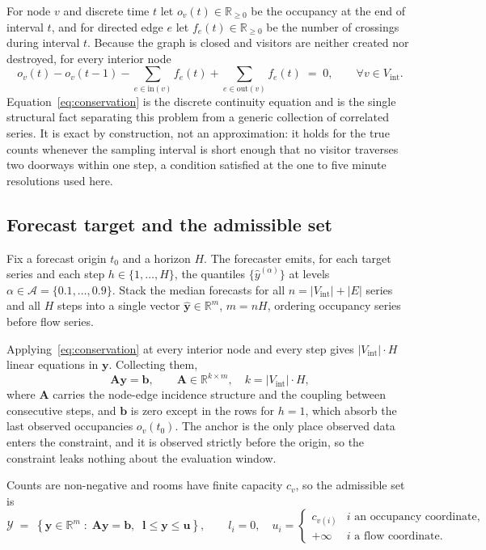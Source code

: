 \documentclass[11pt]{article}
\theoremstyle{plain}
\theoremstyle{definition}
\theoremstyle{remark}
\newcommand{\bA}{\bm{A}}
\newcommand{\by}{\bm{y}}
\newcommand{\bb}{\bm{b}}
\newcommand{\yhat}{\hat{\by}}
\newcommand{\cY}{\mathcal{Y}}
\newcommand{\Rb}{\mathbb{R}}
\begin{document}
For node $v$ and discrete time $t$ let $o_v(t) \in \Rb_{\ge 0}$ be the occupancy at the end of interval $t$, and for directed edge $e$ let $f_e(t) \in \Rb_{\ge 0}$ be the number of crossings during interval $t$. Because the graph is closed and visitors are neither created nor destroyed, for every interior node
\begin{equation}
o_v(t) - o_v(t-1) - \sum_{e \in \mathrm{in}(v)} f_e(t) + \sum_{e \in \mathrm{out}(v)} f_e(t) \;=\; 0,
\qquad \forall v \in V_{\mathrm{int}}.
\label{eq:conservation}
\end{equation}
Equation~\eqref{eq:conservation} is the discrete continuity equation and is the single structural fact separating this problem from a generic collection of correlated series. It is exact by construction, not an approximation: it holds for the true counts whenever the sampling interval is short enough that no visitor traverses two doorways within one step, a condition satisfied at the one to five minute resolutions used here.

\subsection{Forecast target and the admissible set}

Fix a forecast origin $t_0$ and a horizon $H$. The forecaster emits, for each target series and each step $h \in \{1,\dots,H\}$, the quantiles $\{\hat{y}^{(\alpha)}\}$ at levels $\alpha \in \mathcal{A} = \{0.1,\dots,0.9\}$. Stack the median forecasts for all $n = |V_{\mathrm{int}}| + |E|$ series and all $H$ steps into a single vector $\yhat \in \Rb^{m}$, $m = nH$, ordering occupancy series before flow series.

Applying~\eqref{eq:conservation} at every interior node and every step gives $|V_{\mathrm{int}}|\cdot H$ linear equations in $\by$. Collecting them,
\begin{equation}
\bA \by = \bb,
\qquad
\bA \in \Rb^{k \times m},\quad k = |V_{\mathrm{int}}| \cdot H,
\label{eq:system}
\end{equation}
where $\bA$ carries the node-edge incidence structure and the coupling between consecutive steps, and $\bb$ is zero except in the rows for $h=1$, which absorb the last observed occupancies $o_v(t_0)$. The anchor is the only place observed data enters the constraint, and it is observed strictly before the origin, so the constraint leaks nothing about the evaluation window.

Counts are non-negative and rooms have finite capacity $c_v$, so the admissible set is
\begin{equation}
\cY \;=\; \left\{ \by \in \Rb^m \;:\; \bA\by = \bb, \;\; \bm{l} \le \by \le \bm{u} \right\},
\qquad
l_i = 0, \quad
u_i = \begin{cases} c_{v(i)} & \text{$i$ an occupancy coordinate},\\ +\infty & \text{$i$ a flow coordinate}.\end{cases}
\label{eq:admissible}
\end{equation}
\end{document}
